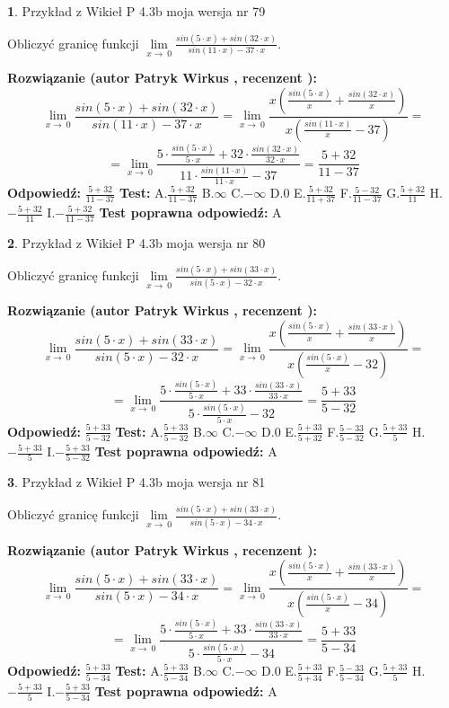 \documentclass[12pt, a4paper]{article}
\theoremstyle{definition} %
\newtheorem{zad}{}
\newcommand{\zadStart}[1]{\begin{zad}#1\newline}
\newcommand{\zadStop}{\end{zad}}
\newcommand{\rozwStart}[2]{\noindent \textbf{Rozwiązanie (autor #1 , recenzent #2): }\newline}
\newcommand{\rozwStop}{\newline}
\newcommand{\odpStart}{\noindent \textbf{Odpowiedź:}\newline}
\newcommand{\odpStop}{\newline}
\newcommand{\testStart}{\noindent \textbf{Test:}\newline}
\newcommand{\testStop}{\newline}
\newcommand{\kluczStart}{\noindent \textbf{Test poprawna odpowiedź:}\newline}
\newcommand{\kluczStop}{\newline}
\begin{document}
\zadStart{Przykład z Wikieł P 4.3b moja wersja nr 79}


Obliczyć granicę funkcji $\lim\limits_{x\to\ 0}\frac{sin(5 \cdot x)+sin(32 \cdot x)}{sin(11 \cdot x)-37 \cdot x}$.
\zadStop
\rozwStart{Patryk Wirkus}{}
$$\lim\limits_{x\to\ 0}\frac{sin(5 \cdot x)+sin(32 \cdot x)}{sin(11 \cdot x)-37 \cdot x}=\lim\limits_{x\to\ 0}\frac{x(\frac{sin(5 \cdot x)}{x}+\frac{sin(32 \cdot x)}{x})}{x(\frac{sin(11 \cdot x)}{x}-37)}=$$
$$=\lim\limits_{x\to\ 0}\frac{5 \cdot \frac{sin(5 \cdot x)}{5 \cdot x}+32 \cdot \frac{sin(32 \cdot x)}{32 \cdot x}}{11 \cdot \frac{sin(11 \cdot x)}{11 \cdot x}-37}=\frac{5+32}{11-37}$$
\rozwStop
\odpStart
$\frac{5+32}{11-37}$
\odpStop
\testStart
A.$\frac{5+32}{11-37}$
B.$\infty$
C.$-\infty$
D.$0$
E.$\frac{5+32}{11+37}$
F.$\frac{5-32}{11-37}$
G.$\frac{5+32}{11}$
H.$-\frac{5+32}{11}$
I.$-\frac{5+32}{11-37}$
\testStop
\kluczStart
A
\kluczStop



\zadStart{Przykład z Wikieł P 4.3b moja wersja nr 80}


Obliczyć granicę funkcji $\lim\limits_{x\to\ 0}\frac{sin(5 \cdot x)+sin(33 \cdot x)}{sin(5 \cdot x)-32 \cdot x}$.
\zadStop
\rozwStart{Patryk Wirkus}{}
$$\lim\limits_{x\to\ 0}\frac{sin(5 \cdot x)+sin(33 \cdot x)}{sin(5 \cdot x)-32 \cdot x}=\lim\limits_{x\to\ 0}\frac{x(\frac{sin(5 \cdot x)}{x}+\frac{sin(33 \cdot x)}{x})}{x(\frac{sin(5 \cdot x)}{x}-32)}=$$
$$=\lim\limits_{x\to\ 0}\frac{5 \cdot \frac{sin(5 \cdot x)}{5 \cdot x}+33 \cdot \frac{sin(33 \cdot x)}{33 \cdot x}}{5 \cdot \frac{sin(5 \cdot x)}{5 \cdot x}-32}=\frac{5+33}{5-32}$$
\rozwStop
\odpStart
$\frac{5+33}{5-32}$
\odpStop
\testStart
A.$\frac{5+33}{5-32}$
B.$\infty$
C.$-\infty$
D.$0$
E.$\frac{5+33}{5+32}$
F.$\frac{5-33}{5-32}$
G.$\frac{5+33}{5}$
H.$-\frac{5+33}{5}$
I.$-\frac{5+33}{5-32}$
\testStop
\kluczStart
A
\kluczStop



\zadStart{Przykład z Wikieł P 4.3b moja wersja nr 81}


Obliczyć granicę funkcji $\lim\limits_{x\to\ 0}\frac{sin(5 \cdot x)+sin(33 \cdot x)}{sin(5 \cdot x)-34 \cdot x}$.
\zadStop
\rozwStart{Patryk Wirkus}{}
$$\lim\limits_{x\to\ 0}\frac{sin(5 \cdot x)+sin(33 \cdot x)}{sin(5 \cdot x)-34 \cdot x}=\lim\limits_{x\to\ 0}\frac{x(\frac{sin(5 \cdot x)}{x}+\frac{sin(33 \cdot x)}{x})}{x(\frac{sin(5 \cdot x)}{x}-34)}=$$
$$=\lim\limits_{x\to\ 0}\frac{5 \cdot \frac{sin(5 \cdot x)}{5 \cdot x}+33 \cdot \frac{sin(33 \cdot x)}{33 \cdot x}}{5 \cdot \frac{sin(5 \cdot x)}{5 \cdot x}-34}=\frac{5+33}{5-34}$$
\rozwStop
\odpStart
$\frac{5+33}{5-34}$
\odpStop
\testStart
A.$\frac{5+33}{5-34}$
B.$\infty$
C.$-\infty$
D.$0$
E.$\frac{5+33}{5+34}$
F.$\frac{5-33}{5-34}$
G.$\frac{5+33}{5}$
H.$-\frac{5+33}{5}$
I.$-\frac{5+33}{5-34}$
\testStop
\kluczStart
A
\kluczStop
\end{document}
